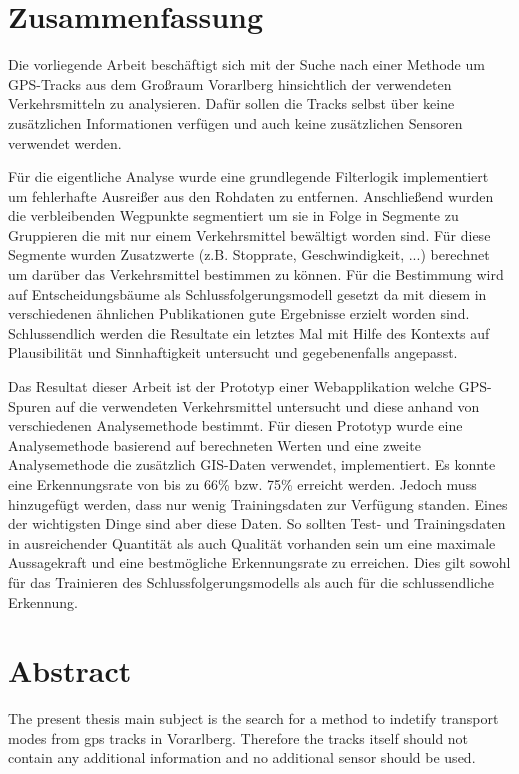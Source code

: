 \section*{Zusammenfassung}

Die vorliegende Arbeit beschäftigt sich mit der Suche nach einer Methode um GPS-Tracks  aus dem Großraum Vorarlberg hinsichtlich der verwendeten Verkehrsmitteln zu analysieren. Dafür sollen die Tracks selbst über keine zusätzlichen Informationen verfügen und auch keine zusätzlichen Sensoren verwendet werden.

Für die eigentliche Analyse wurde eine grundlegende Filterlogik implementiert um fehlerhafte Ausreißer aus den Rohdaten zu entfernen. Anschließend wurden die verbleibenden Wegpunkte segmentiert um sie in Folge in Segmente zu Gruppieren die mit nur einem Verkehrsmittel bewältigt worden sind. Für diese Segmente wurden Zusatzwerte (z.B. Stopprate, Geschwindigkeit, ...) berechnet um darüber das Verkehrsmittel bestimmen zu können. Für die Bestimmung wird auf Entscheidungsbäume als Schlussfolgerungsmodell gesetzt da mit diesem in verschiedenen ähnlichen Publikationen gute Ergebnisse erzielt worden sind. Schlussendlich werden die Resultate ein letztes Mal mit Hilfe des Kontexts auf Plausibilität und Sinnhaftigkeit untersucht und gegebenenfalls angepasst.

Das Resultat dieser Arbeit ist der Prototyp einer Webapplikation welche GPS-Spuren auf die verwendeten Verkehrsmittel untersucht und diese anhand von verschiedenen Analysemethode bestimmt. Für diesen Prototyp wurde eine Analysemethode basierend auf berechneten Werten und eine zweite Analysemethode die zusätzlich GIS-Daten verwendet, implementiert. Es konnte eine Erkennungsrate von bis zu 66\% bzw. 75\% erreicht werden. Jedoch muss hinzugefügt werden, dass nur wenig Trainingsdaten zur Verfügung standen. Eines der wichtigsten Dinge sind aber diese Daten. So sollten Test- und Trainingsdaten in ausreichender Quantität als auch Qualität vorhanden sein um eine maximale Aussagekraft und eine bestmögliche Erkennungsrate zu erreichen. Dies gilt sowohl für das Trainieren des Schlussfolgerungsmodells als auch für die schlussendliche Erkennung.

\afterpage{\blankpage}
\newpage

\section*{Abstract}

The present thesis main subject is the search for a method to indetify transport modes from gps tracks in Vorarlberg. Therefore the tracks itself should not contain any additional information and no additional sensor should be used.

